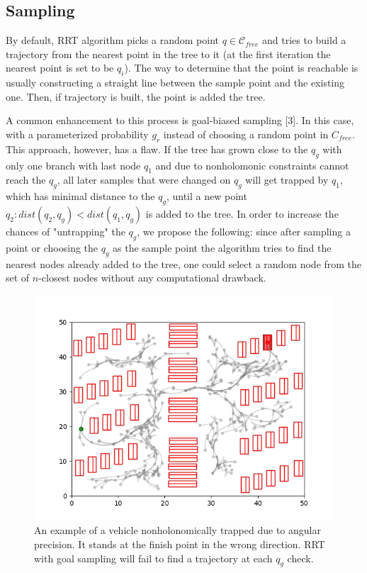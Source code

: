 \documentclass[a4paper,12pt]{article}
\DeclareRobustCommand{\[}{\begin{equation}}
\DeclareRobustCommand{\]}{\end{equation}}
\numberwithin{equation}{section}
\numberwithin{algorithm}{section}
\begin{document}
\subsection{Sampling}

By default, RRT algorithm picks a random point $q\in\mathcal{C}_{free}$ and tries to build a trajectory from the nearest point in the tree to it (at the first iteration the
nearest point is set to be $q_i$).
The way to determine that the point is reachable is usually constructing a straight line between the sample point and the existing one.
Then, if trajectory is built, the point is added the tree.

A common enhancement to this process is goal-biased sampling [3]. In this case, with a parameterized probability $g_r$ instead of choosing a random point in $C_{free}$. This approach, however,
has a flaw. If the tree has grown close to the $q_g$ with only one branch with last node $q_1$ and due to nonholomonic constraints cannot reach the $q_g$, all later samples that
were changed on $q_g$ will get trapped by $q_1$, which has minimal distance to the $q_g$, until a new point $q_2: dist(q_2, q_g) < dist(q_1, q_g)$ is added to the tree.
In order to increase the chances of "untrapping" the $q_g$, we propose the following: since after sampling a point or choosing the $q_g$ as the sample point the algorithm tries to 
find the nearest nodes already added to the tree, one could select a random node from the set of $n$-closest nodes without any computational drawback.

\begin{figure}[H]
\begin{center}
\includegraphics[scale=0.7]{images/car_trapped.png}
\captionsetup{width=0.6\textwidth}
\caption{An example of a vehicle nonholonomically trapped due to angular precision. It stands at the finish point in the wrong direction. RRT with goal sampling will fail to find a trajectory at each $q_g$ check.}
\end{center}
\end{figure}
\end{document}
